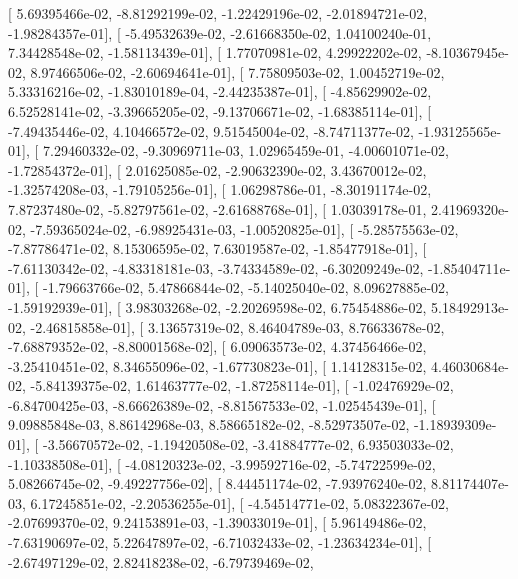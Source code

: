 \documentclass{article}
\begin{document}
       [  5.69395466e-02,  -8.81292199e-02,  -1.22429196e-02,
         -2.01894721e-02,  -1.98284357e-01],
       [ -5.49532639e-02,  -2.61668350e-02,   1.04100240e-01,
          7.34428548e-02,  -1.58113439e-01],
       [  1.77070981e-02,   4.29922202e-02,  -8.10367945e-02,
          8.97466506e-02,  -2.60694641e-01],
       [  7.75809503e-02,   1.00452719e-02,   5.33316216e-02,
         -1.83010189e-04,  -2.44235387e-01],
       [ -4.85629902e-02,   6.52528141e-02,  -3.39665205e-02,
         -9.13706671e-02,  -1.68385114e-01],
       [ -7.49435446e-02,   4.10466572e-02,   9.51545004e-02,
         -8.74711377e-02,  -1.93125565e-01],
       [  7.29460332e-02,  -9.30969711e-03,   1.02965459e-01,
         -4.00601071e-02,  -1.72854372e-01],
       [  2.01625085e-02,  -2.90632390e-02,   3.43670012e-02,
         -1.32574208e-03,  -1.79105256e-01],
       [  1.06298786e-01,  -8.30191174e-02,   7.87237480e-02,
         -5.82797561e-02,  -2.61688768e-01],
       [  1.03039178e-01,   2.41969320e-02,  -7.59365024e-02,
         -6.98925431e-03,  -1.00520825e-01],
       [ -5.28575563e-02,  -7.87786471e-02,   8.15306595e-02,
          7.63019587e-02,  -1.85477918e-01],
       [ -7.61130342e-02,  -4.83318181e-03,  -3.74334589e-02,
         -6.30209249e-02,  -1.85404711e-01],
       [ -1.79663766e-02,   5.47866844e-02,  -5.14025040e-02,
          8.09627885e-02,  -1.59192939e-01],
       [  3.98303268e-02,  -2.20269598e-02,   6.75454886e-02,
          5.18492913e-02,  -2.46815858e-01],
       [  3.13657319e-02,   8.46404789e-03,   8.76633678e-02,
         -7.68879352e-02,  -8.80001568e-02],
       [  6.09063573e-02,   4.37456466e-02,  -3.25410451e-02,
          8.34655096e-02,  -1.67730823e-01],
       [  1.14128315e-02,   4.46030684e-02,  -5.84139375e-02,
          1.61463777e-02,  -1.87258114e-01],
       [ -1.02476929e-02,  -6.84700425e-03,  -8.66626389e-02,
         -8.81567533e-02,  -1.02545439e-01],
       [  9.09885848e-03,   8.86142968e-03,   8.58665182e-02,
         -8.52973507e-02,  -1.18939309e-01],
       [ -3.56670572e-02,  -1.19420508e-02,  -3.41884777e-02,
          6.93503033e-02,  -1.10338508e-01],
       [ -4.08120323e-02,  -3.99592716e-02,  -5.74722599e-02,
          5.08266745e-02,  -9.49227756e-02],
       [  8.44451174e-02,  -7.93976240e-02,   8.81174407e-03,
          6.17245851e-02,  -2.20536255e-01],
       [ -4.54514771e-02,   5.08322367e-02,  -2.07699370e-02,
          9.24153891e-03,  -1.39033019e-01],
       [  5.96149486e-02,  -7.63190697e-02,   5.22647897e-02,
         -6.71032433e-02,  -1.23634234e-01],
       [ -2.67497129e-02,   2.82418238e-02,  -6.79739469e-02,
\end{document}
